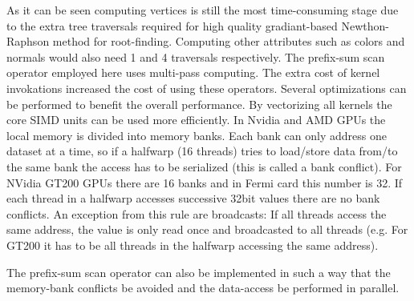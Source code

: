As it can be seen computing vertices is still the most time-consuming stage due to the extra tree traversals required for high quality 
gradiant-based Newthon-Raphson method for root-finding. Computing other attributes such as colors and normals would also need 1 and 4 
traversals respectively. The prefix-sum scan operator employed here uses multi-pass computing. The extra cost of kernel invokations
increased the cost of using these operators. Several optimizations can be performed to benefit the overall performance. By 
vectorizing all kernels the core SIMD units can be used more efficiently. 
In Nvidia and AMD GPUs the local memory is divided into memory banks. Each bank can only address one dataset at a time, so if a halfwarp (16 threads)
tries to load/store data from/to the same bank the access has to be serialized (this is called a bank conflict). 
For NVidia GT200 GPUs there are 16 banks and in Fermi card this number is 32. If each thread in a halfwarp accesses successive 32bit values
there are no bank conflicts. An exception from this rule are broadcasts: If all threads access the same address, the value is only read once and
broadcasted to all threads (e.g. For GT200 it has to be all threads in the halfwarp accessing the same address).

The prefix-sum scan operator can also be implemented in such a way that the memory-bank conflicts be avoided and the data-access
be performed in parallel.



















